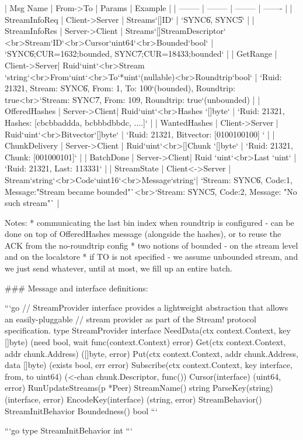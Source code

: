 | Msg Name | From->To | Params   | Example |
| -------- | -------- | -------- | ------- |
| StreamInfoReq   | Client->Server  | Streams`[]ID` | `SYNC\|6, SYNC\|5` |
| StreamInfoRes   | Server->Client  | Streams`[]StreamDescriptor` <br>Stream`ID`<br>Cursor`uint64`<br>Bounded`bool` | `SYNC\|6;CUR=1632;bounded, SYNC\|7;CUR=18433;bounded` |
| GetRange | Client->Server| Ruid`uint`<br>Stream `string`<br>From`uint`<br>To`*uint`(nullable)<br>Roundtrip`bool` | `Ruid: 21321, Stream: SYNC\|6, From: 1, To: 100`(bounded), Roundtrip: true<br>`Stream: SYNC\|7, From: 109, Roundtrip: true`(unbounded) | 
| OfferedHashes | Server->Client| Ruid`uint`<br>Hashes `[]byte` | `Ruid: 21321, Hashes: [cbcbbaddda, bcbbbdbbdc, ....]` |
| WantedHashes | Client->Server | Ruid`uint`<br>Bitvector`[]byte` | `Ruid: 21321, Bitvector: [0100100100] ` |
| ChunkDelivery | Server->Client | Ruid`uint`<br>[]Chunk `[]byte` | `Ruid: 21321, Chunk: [001000101]` |
| BatchDone | Server->Client| Ruid `uint`<br>Last `uint` | `Ruid: 21321, Last: 113331` |
| StreamState | Client<->Server | Stream`string`<br>Code`uint16`<br>Message`string`| `Stream: SYNC\|6, Code:1, Message:"Stream became bounded"`<br>`Stream: SYNC\|5, Code:2, Message: "No such stream"` |

Notes:
* communicating the last bin index when roundtrip is configured - can be done on top of OfferedHashes message (alongside the hashes), or to reuse the ACK from the no-roundtrip config
* two notions of bounded - on the stream level and on the localstore
* if TO is not specified - we assume unbounded stream, and we just send whatever, until at most, we fill up an entire batch.

### Message and interface definitions:


```go
// StreamProvider interface provides a lightweight abstraction that allows an easily-pluggable
// stream provider as part of the Stream! protocol specification.
type StreamProvider interface {
  NeedData(ctx context.Context, key []byte) (need bool, wait func(context.Context) error)
	Get(ctx context.Context, addr chunk.Address) ([]byte, error)
	Put(ctx context.Context, addr chunk.Address, data []byte) (exists bool, err error)
	Subscribe(ctx context.Context, key interface{}, from, to uint64) (<-chan chunk.Descriptor, func())
	Cursor(interface{}) (uint64, error)
	RunUpdateStreams(p *Peer)
	StreamName() string
	ParseKey(string) (interface{}, error)
	EncodeKey(interface{}) (string, error)
	StreamBehavior() StreamInitBehavior
	Boundedness() bool
}
```

```go
type StreamInitBehavior int
```

